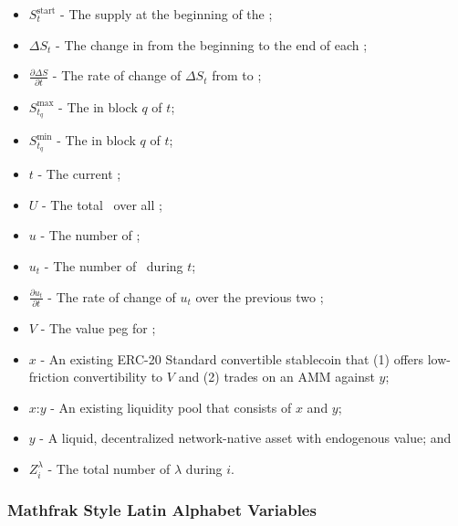 \documentclass[class=article, crop=false]{standalone}
\begin{document}
\begin{itemize}[topsep=0pt, itemsep=3pt,leftmargin=16pt]
    \item[] $S_t^{\text{start}}$ - \hypertarget{ht173}{The  supply at the beginning of the };
    \item[] $\Delta S_t$ - \hypertarget{ht60}{The change in  from the beginning to the end of each };
    \item[] $\frac{\partial \Delta S}{\partial t}$ - \hypertarget{ht63}{The rate of change of $\Delta S_t$ from  to };
    \item[] $S_{t_q}^{\text{max}}$ - The  in block $q$ of $t$;
    \item[] $S_{t_q}^{\text{min}}$ - The  in block $q$ of $t$;
    \item[] $t$ - \hypertarget{ht204}{The current };
    \item[] $U$ - \hypertarget{ht207}{The total  \Bean\ over all };
    \item[] $u$ - \hypertarget{ht208}{The number of  \Bean};
    \item[] $u_t$ - The number of  \Bean\ during $t$;
    \item[] $\frac{\partial u_t}{\partial t}$ - The rate of change of $u_t$ over the previous two ;
    \item[] $V$ - \hypertarget{ht216}{The value peg for };
    \item[] $x$ - \hypertarget{ht223}{An existing ERC-20 Standard convertible stablecoin that (1) offers low-friction convertibility to $V$ and (2) trades on an AMM against $y$};
    \item[] $x$:$y$ - \hypertarget{ht224}{An existing liquidity pool that consists of $x$ and $y$};
    \item[] $y$ - \hypertarget{ht227}{A liquid, decentralized network-native asset with endogenous value}; and
    \item[] $Z_i^{\lambda}$ - \hypertarget{ht231}{The total number of $\lambda$  during  $i$}.
\end{itemize}

\subsubsection{Mathfrak Style Latin Alphabet Variables}
\end{document}
